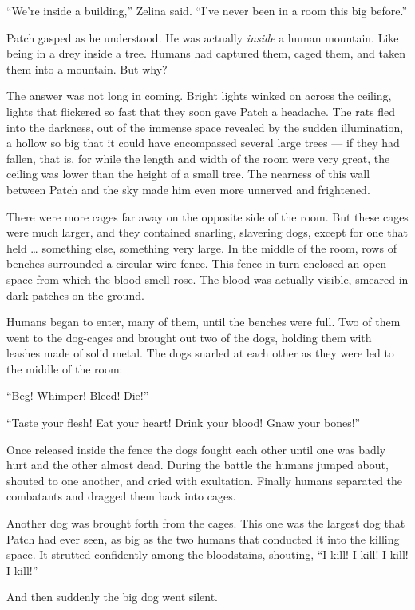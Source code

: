 \documentclass[12pt]{memoir}
\begin{document}
“We’re inside a building,” Zelina said. “I’ve never been in a room
this big before.”

Patch gasped as he understood. He was actually \textit{inside} a human
mountain. Like being in a drey inside a tree. Humans had captured
them, caged them, and taken them into a mountain. But why?

The answer was not long in coming. Bright lights winked on across the
ceiling, lights that flickered so fast that they soon gave Patch a
headache. The rats fled into the darkness, out of the immense space
revealed by the sudden illumination, a hollow so big that it could
have encompassed several large trees — if they had fallen, that is,
for while the length and width of the room were very great, the
ceiling was lower than the height of a small tree. The nearness of
this wall between Patch and the sky made him even more unnerved and
frightened.

There were more cages far away on the opposite side of the room. But
these cages were much larger, and they contained snarling, slavering
dogs, except for one that held … something else, something very
large. In the middle of the room, rows of benches surrounded a
circular wire fence. This fence in turn enclosed an open space from
which the blood-smell rose. The blood was actually visible, smeared in
dark patches on the ground.

Humans began to enter, many of them, until the benches were full. Two
of them went to the dog-cages and brought out two of the dogs, holding
them with leashes made of solid metal. The dogs snarled at each other
as they were led to the middle of the room:

“Beg! Whimper! Bleed! Die!”

“Taste your flesh! Eat your heart! Drink your blood! Gnaw your bones!”

Once released inside the fence the dogs fought each other until one
was badly hurt and the other almost dead. During the battle the humans
jumped about, shouted to one another, and cried with
exultation. Finally humans separated the combatants and dragged them
back into cages.

Another dog was brought forth from the cages. This one was the largest
dog that Patch had ever seen, as big as the two humans that conducted
it into the killing space. It strutted confidently among the
bloodstains, shouting, “I kill! I kill! I kill! I kill!”

And then suddenly the big dog went silent.
\end{document}
